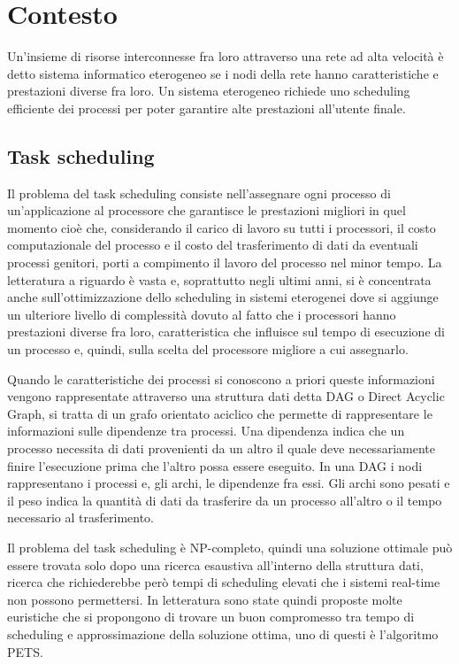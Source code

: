 \chapter{Contesto}
\vspace{4cm}
Un'insieme di risorse interconnesse fra loro attraverso una rete ad alta velocità è detto sistema informatico eterogeneo se i nodi della rete hanno caratteristiche e prestazioni diverse fra loro.
Un sistema eterogeneo richiede uno scheduling efficiente dei processi per poter garantire alte prestazioni all'utente finale.

\section{Task scheduling}
Il problema del task scheduling consiste nell'assegnare ogni processo di un'applicazione al processore che garantisce le prestazioni migliori in quel momento cioè che, considerando il carico di lavoro su tutti i processori, il costo computazionale del processo e il costo del trasferimento di dati da eventuali processi genitori, porti a compimento il lavoro del processo nel minor tempo.
La letteratura a riguardo è vasta e, soprattutto negli ultimi anni, si è concentrata anche sull'ottimizzazione dello scheduling in sistemi eterogenei dove si aggiunge un ulteriore livello di complessità dovuto al fatto che i processori hanno prestazioni diverse fra loro, caratteristica che influisce sul tempo di esecuzione di un processo e, quindi, sulla scelta del processore migliore a cui assegnarlo.

Quando le caratteristiche dei processi si conoscono a priori queste informazioni vengono rappresentate attraverso una struttura dati detta DAG o Direct Acyclic Graph, si tratta di un grafo orientato aciclico che permette di rappresentare le informazioni sulle dipendenze tra processi. Una dipendenza indica che un processo necessita di dati provenienti da un altro il quale deve necessariamente finire l'esecuzione prima che l'altro possa essere eseguito.
In una DAG i nodi rappresentano i processi e, gli archi, le dipendenze fra essi. Gli archi sono pesati e il peso indica la quantità di dati da trasferire da un processo all'altro o il tempo necessario al trasferimento.

Il problema del task scheduling è NP-completo, quindi una soluzione ottimale può essere trovata solo dopo una ricerca esaustiva all'interno della struttura dati, ricerca che richiederebbe però tempi di scheduling elevati che i sistemi real-time non possono permettersi. 
In letteratura sono state quindi proposte molte euristiche che si propongono di trovare un buon compromesso tra tempo di scheduling e approssimazione della soluzione ottima, uno di questi è l'algoritmo PETS.


